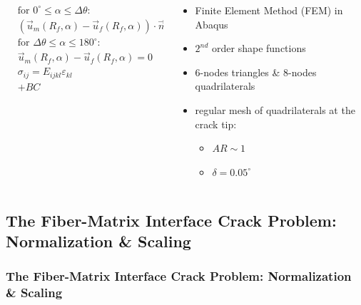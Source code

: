 \documentclass[first,firstsupp,lastsupp,last,hyperref,table]{ETHclass}
\begin{document}
\begin{frame}
\begin{columns}
\begin{column}{0.6\textwidth}
\begin{columns}
\begin{column}{0.6\columnwidth}
\tiny
\begin{equation*}
\begin{aligned}
&\text{for } 0^{\circ}\leq\alpha\leq\Delta\theta:\\
&\left(\overrightarrow{u}_{m}\left(R_{f},\alpha\right)-\overrightarrow{u}_{f}\left(R_{f},\alpha\right)\right)\cdot\overrightarrow{n}_{\alpha}\geq 0\\
&\text{for } \Delta\theta\leq\alpha\leq 180^{\circ}:\\
&\overrightarrow{u}_{m}\left(R_{f},\alpha\right)-\overrightarrow{u}_{f}\left(R_{f},\alpha\right)=0\\
&\sigma_{ij}=E_{ijkl}\varepsilon_{kl}\\
&+BC
\end{aligned}
\end{equation*}
\end{column}
\end{columns}
\end{column}
\begin{column}{0.3\textwidth}
\scriptsize
\begin{itemize}[label=]
\item Finite Element Method (FEM) in Abaqus\texttrademark
\item $2^{nd}$ order shape functions
\item 6-nodes triangles \& 8-nodes quadrilaterals
\item regular mesh of quadrilaterals at the crack tip:
\begin{itemize}[label=-]
\item $AR\sim 1$
\item $\delta=0.05^{\circ}$
\end{itemize}
\end{itemize}
\end{column}
\end{columns}
\end{frame}

\subsection[Normalization \& Scaling]{The Fiber-Matrix Interface Crack Problem: Normalization \& Scaling}

\begin{frame}
\frametitle{\vspace{0.3cm}\small The Fiber-Matrix Interface Crack Problem: Normalization \& Scaling}
\vspace{-1.cm}
\centering

\end{frame}
\end{document}
